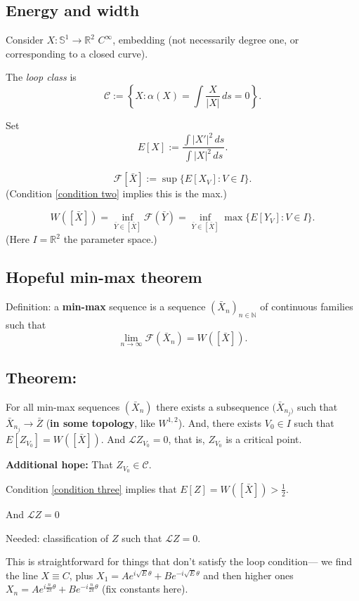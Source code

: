 \documentclass[12pt, a4paper]{amsart}
\theoremstyle{remark}
\newcommand{\R}{\mathbb{R}}
\newcommand{\So}{\mathbb{S}^1}
\begin{document}
\subsection*{Energy and width}

Consider $X:\So\rightarrow \R^2$ $C^\infty$, embedding (not necessarily degree one, or corresponding to a closed curve).   

The \emph{loop class} is 
$$\mathcal{C}:=\left\lbrace X:  \alpha(X)= \int \frac{X}{|X|}\,ds  =0 \right\rbrace.$$

Set $$E[X]:=\frac{\int |X'|^2\,ds}{\int|X|^2\,ds }.$$

$$\mathcal{F}[\bar{X}]:= \sup \lbrace E[X_V]: V\in I\rbrace.$$
(Condition \ref{condition two} implies this is the max.)

$$W([\bar{X}])= \inf_{\bar{Y}\in [\bar{X}]} \mathcal{F}(\bar{Y})=  \inf_{\bar{Y}\in [\bar{X}]}  \max\lbrace E[Y_V]:V\in I\rbrace.$$
(Here $I=\R^2$ the parameter space.)




\subsection*{Hopeful min-max theorem}

Definition:  a \textbf{min-max} sequence is a sequence $(\bar{X}_n)_{n\in\mathbb{N}}$ of continuous families such that 
$$\lim_{n\rightarrow\infty} \mathcal{F}(\bar{X}_n)=W([\bar{X}]).$$

\subsection*{Theorem:} For all min-max sequences $(\bar{X}_n)$ there exists a subsequence $(\bar{X}_{n_j)}$ such that $\bar{X}_{n_j}\rightarrow \bar{Z}$ (\textbf{in some topology}, like $W^{1,2}$).    And, there exists $V_0\in I$ such that $E[Z_{V_0}]=W([\bar{X}])$.  And $\mathcal{L} Z_{V_0}=0$, that is, $Z_{V_0}$ is a critical point.

\textbf{Additional hope:}   That $Z_{V_0}\in \mathcal{C}$.  

Condition \ref{condition three} implies that $E[Z]=W([\bar{X}])>\frac12$.   

And $\mathcal{L}Z=0$

Needed:  classification of $Z$ such that $\mathcal{L}Z=0$.  

This is straightforward for things that don't satisfy the loop condition--- we find  the line  $X\equiv C$, plus $X_1= Ae^{i\sqrt{E}\theta}+Be^{-i\sqrt{E}\theta}$ and then higher ones $X_n= Ae^{i \frac{n}{2\pi}\theta}+Be^{-i\frac{n}{2\pi}\theta}$ (fix constants here).   
\end{document}
